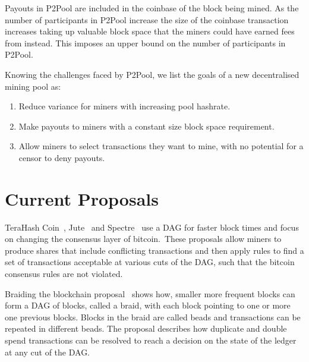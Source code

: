 \documentclass{article}
\begin{document}
Payouts in P2Pool are included in the coinbase of the block being
mined. As the number of participants in P2Pool increase the size of
the coinbase transaction increases taking up valuable block space that
the miners could have earned fees from instead. This imposes an upper
bound on the number of participants in P2Pool.

Knowing the challenges faced by P2Pool, we list the goals of a new
decentralised mining pool as:

\begin{enumerate}
\item Reduce variance for miners with increasing pool hashrate.
\item Make payouts to miners with a constant size block space
  requirement.
\item Allow miners to select transactions they want to mine, with no
  potential for a censor to deny payouts.
\end{enumerate}

\section{Current Proposals}

TeraHash Coin~\cite{mcelrath:variance}, Jute~\cite{jute} and
Spectre~\cite{spectre} use a DAG for faster block times and focus on
changing the consensus layer of bitcoin.\ These proposals allow miners
to produce shares that include conflicting transactions and then apply
rules to find a set of transactions acceptable at various cuts of the
DAG, such that the bitcoin consensus rules are not violated.

Braiding the blockchain proposal~\cite{mcelrath:variance} shows how,
smaller more frequent blocks can form a DAG of blocks, called a braid,
with each block pointing to one or more one previous blocks. Blocks in
the braid are called beads and transactions can be repeated in
different beads. The proposal describes how duplicate and double spend
transactions can be resolved to reach a decision on the state of the
ledger at any cut of the DAG.\@

\end{document}
